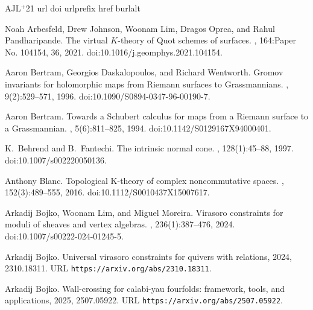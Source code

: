 \documentclass[11pt]{amsart}
\theoremstyle{remark}
\numberwithin{theorem}{section}
\begin{document}
\newcommand{\etalchar}[1]{$^{#1}$}
\begin{thebibliography}{AJL{\etalchar{+}}21}
\expandafter\ifx\csname url\endcsname\relax
  \def\url#1{\texttt{#1}}\fi
\expandafter\ifx\csname doi\endcsname\relax
  \def\doi#1{\burlalt{doi:#1}{http://dx.doi.org/#1}}\fi
\expandafter\ifx\csname urlprefix\endcsname\relax\def\urlprefix{URL }\fi
\expandafter\ifx\csname href\endcsname\relax
  \def\href#1#2{#2}\fi
\expandafter\ifx\csname burlalt\endcsname\relax
  \def\burlalt#1#2{\href{#2}{#1}}\fi

\bibitem[AJL{\etalchar{+}}21]{AJLOP}
Noah Arbesfeld, Drew Johnson, Woonam Lim, Dragos Oprea, and Rahul
  Pandharipande.
\newblock The virtual {$K$}-theory of {Q}uot schemes of surfaces.
, 164:Paper No. 104154, 36, 2021.
\newblock \doi{10.1016/j.geomphys.2021.104154}.

Aaron Bertram, Georgios Daskalopoulos, and Richard Wentworth.
\newblock Gromov invariants for holomorphic maps from {R}iemann surfaces to
  {G}rassmannians.
, 9(2):529--571, 1996.
\newblock \doi{10.1090/S0894-0347-96-00190-7}.

Aaron Bertram.
\newblock Towards a {S}chubert calculus for maps from a {R}iemann surface to a
  {G}rassmannian.
, 5(6):811--825, 1994.
\newblock \doi{10.1142/S0129167X94000401}.

K.~Behrend and B.~Fantechi.
\newblock The intrinsic normal cone.
, 128(1):45--88, 1997.
\newblock \doi{10.1007/s002220050136}.

Anthony Blanc.
\newblock Topological {K}-theory of complex noncommutative spaces.
, 152(3):489--555, 2016.
\newblock \doi{10.1112/S0010437X15007617}.

Arkadij Bojko, Woonam Lim, and Miguel Moreira.
\newblock Virasoro constraints for moduli of sheaves and vertex algebras.
, 236(1):387--476, 2024.
\newblock \doi{10.1007/s00222-024-01245-5}.

Arkadij Bojko.
\newblock Universal virasoro constraints for quivers with relations, 2024,
  \burlalt{2310.18311}{http://arxiv.org/abs/2310.18311}.
\newblock \urlprefix\url{https://arxiv.org/abs/2310.18311}.

Arkadij Bojko.
\newblock Wall-crossing for calabi-yau fourfolds: framework, tools, and
  applications, 2025, \burlalt{2507.05922}{http://arxiv.org/abs/2507.05922}.
\newblock \urlprefix\url{https://arxiv.org/abs/2507.05922}.


\end{thebibliography}
\end{document}
